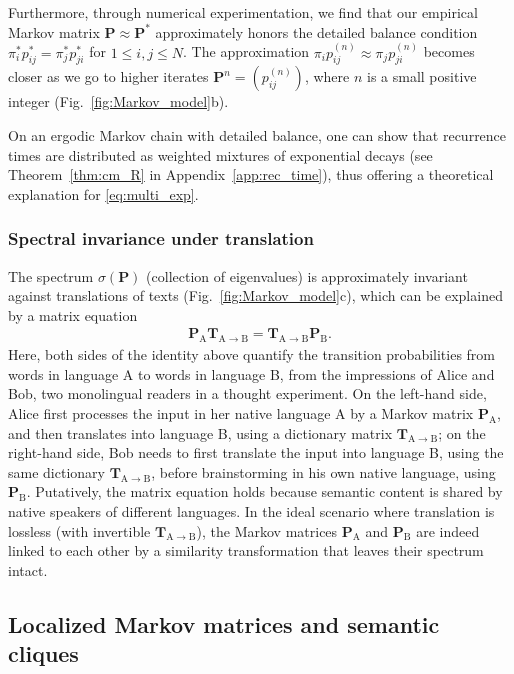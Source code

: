 \documentclass[10pt,journal,compsoc]{IEEEtran}
\begin{document}
Furthermore, through numerical experimentation, we find that our empirical Markov matrix $ \mathbf P\approx\mathbf P^*$ approximately honors the detailed balance condition  $ \pi_i^{*}p_{ij}^*= \pi_j^*p_{ji}^*$ for  $ 1\leq i,j\leq N$. The approximation    $ \pi_ip_{ij}^{(n)}\approx \pi_jp_{ji}^{(n)}$  becomes closer as we go to  higher iterates $ \mathbf P^n=(p_{ij}^{(n)})$, where $n$ is a small positive integer (Fig.~\ref{fig:Markov_model}b).

On an ergodic Markov chain with detailed balance, one can show that recurrence times are distributed as  weighted mixtures of exponential decays (see Theorem~\ref{thm:cm_R} in Appendix~\ref{app:rec_time}), thus offering a theoretical explanation for    \eqref{eq:multi_exp}.
 \subsubsection{Spectral invariance under translation}
The spectrum
$\sigma( \mathbf{ P})$
(collection of eigenvalues) is approximately invariant against translations of texts  (Fig.~\ref{fig:Markov_model}c), which can be explained by   a matrix equation   \begin{align}
 \mathbf P_{\mathrm A}\mathbf T_{\mathrm A\to\mathrm B}=\mathbf T_{\mathrm A\to\mathrm B}\mathbf P_{\mathrm B}.\label{eq:PTTP}\end{align}Here, both sides of the identity  above quantify the transition probabilities from words in language A to words in language B, from the impressions of   Alice and Bob, two monolingual readers in a thought experiment.   On the left-hand side, Alice first processes the input in her native language A by a Markov matrix $ \mathbf P_{\mathrm A}$, and then translates into language B, using a dictionary matrix $ \mathbf T_{\mathrm A\to\mathrm B}$; on the right-hand side, Bob needs to first translate the input into language B, using the same dictionary  $\mathbf  T_{\mathrm A\to\mathrm B}$, before brainstorming in his own native language, using $   \mathbf P_{\mathrm B}$. Putatively, the matrix equation holds because semantic content is shared by native speakers of different languages. In the ideal scenario where translation is lossless (with invertible  $ \mathbf T_{\mathrm A\to\mathrm B}$), the Markov matrices   $ \mathbf P_{\mathrm A}$ and  $ \mathbf P_{\mathrm B}$ are indeed linked to each other by a similarity transformation that leaves their spectrum intact.
\subsection{Localized Markov matrices and semantic cliques}
\end{document}
